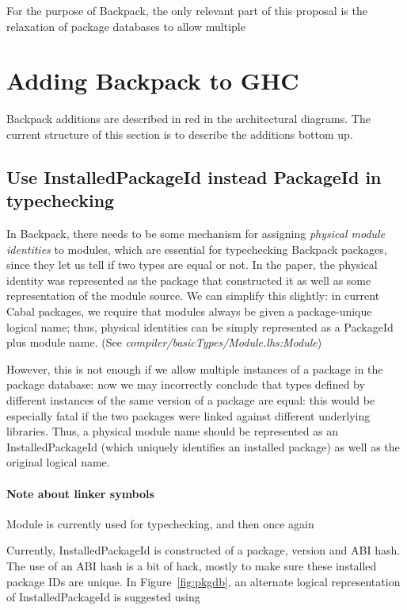 \documentclass{article}
\newcommand{\ghcfile}[1]{\textsl{#1}}
\begin{document}
For the purpose of Backpack, the only relevant part of this proposal
is the relaxation of package databases to allow multiple 

\section{Adding Backpack to GHC}

Backpack additions are described in red in the architectural diagrams.
The current structure of this section is to describe the additions bottom up.

\subsection{Use InstalledPackageId instead PackageId in typechecking}

In Backpack, there needs to be some mechanism for assigning
\emph{physical module identities} to modules, which are essential for
typechecking Backpack packages, since they let us tell if two types are
equal or not. In the paper, the physical identity was represented as the
package that constructed it as well as some representation of the module
source.  We can simplify this slightly: in current Cabal packages, we
require that modules always be given a package-unique logical name;
thus, physical identities can be simply represented as a PackageId plus
module name. (See \ghcfile{compiler/basicTypes/Module.lhs:Module})

However, this is not enough if we allow multiple instances of a package
in the package database: now we may incorrectly conclude that types
defined by different instances of the same version of a package are
equal: this would be especially fatal if the two packages were linked
against different underlying libraries.  Thus, a physical module name
should be represented as an InstalledPackageId (which uniquely
identifies an installed package) as well as the original logical name.

\paragraph{Note about linker symbols} Module is currently used for
typechecking, and then once again

Currently, InstalledPackageId is constructed of a package, version and ABI
hash.  The use of an ABI hash is a bit of hack, mostly to make sure these
installed package IDs are unique.  In Figure~\ref{fig:pkgdb}, an alternate
logical representation of InstalledPackageId is suggested using 
\end{document}
